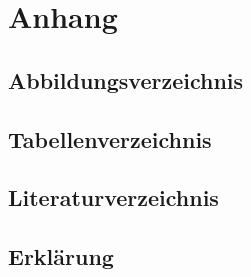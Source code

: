 

	

\section{Anhang}

% 

% 




\subsection{Abbildungsverzeichnis}
\listoffigures
\newpage

\subsection{Tabellenverzeichnis}
\listoftables
\newpage

\subsection{Literaturverzeichnis}
\printbibliography[heading=none]


%
\newpage
\subsection{Erklärung}



